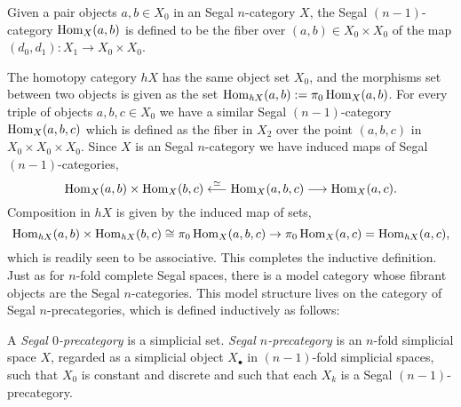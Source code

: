 \documentclass{amsart}
\begin{document}
Given a pair objects $a,b \in X_0$ in an  Segal $n$-category $X$, the  Segal $(n-1)$-category $\operatorname{Hom}_X(a,b)$ is defined to be the fiber 
over $(a,b) \in X_0 \times X_0$ of the map $(d_0, d_1): X_1 \to X_0 \times X_0$.  
\begin{center}
\end{center}
The homotopy category $\mathit{h}X$ has the same object set $X_0$, and the morphisms set between two objects is given as the set $\operatorname{Hom}_{\mathit{h}X}(a,b) := \pi_0 \operatorname{Hom}_X(a,b)$.  For every triple of objects $a,b,c \in X_0$ we have a similar  Segal $(n-1)$-category $\operatorname{Hom}_X(a,b,c)$ which is defined as the fiber in $X_2$ over the point $(a,b,c)$ in $X_0 \times X_0 \times X_0$. Since $X$ is an  Segal $n$-category we have induced maps of  Segal $(n-1)$-categories,
\begin{equation*}
	\operatorname{Hom}_X(a,b) \times \operatorname{Hom}_X(b,c) \stackrel{\simeq}{\longleftarrow} \operatorname{Hom}_X(a,b,c) \stackrel{}{\longrightarrow} \operatorname{Hom}_X(a,c).
\end{equation*}
Composition in $\mathit{h}X$ is given by the induced map of sets,
\begin{equation*}
	 \operatorname{Hom}_{\mathit{h}X}(a,b) \times \operatorname{Hom}_{\mathit{h}X}(b,c) \cong \pi_0 \operatorname{Hom}_X(a,b,c)\to \pi_0 \operatorname{Hom}_X(a,c) = \operatorname{Hom}_{\mathit{h}X}(a,c),
\end{equation*}
which is readily seen to be associative. This completes the inductive definition. Just as for $n$-fold complete Segal spaces, there is a model category whose fibrant objects are the Segal $n$-categories. This model structure lives on the category of Segal $n$-precategories, which is defined inductively as follows:

\begin{definition}
	A {\em Segal $0$-precategory} is a simplicial set. {\em Segal $n$-precategory} is an $n$-fold simplicial space $X$, regarded as a simplicial object $X_\bullet$ in $(n-1)$-fold simplicial spaces, such that $X_0$ is constant and discrete and such that each $X_k$ is a  Segal $(n-1)$-precategory. 
\end{definition}
\end{document}
